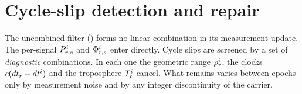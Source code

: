 \documentclass[main.tex]{subfiles}
\begin{document}
\section{Cycle-slip detection and repair}\label{sec:slip}

The uncombined filter () forms no linear combination in its
measurement update.  The per-signal $P^i_{r,s}$ and
$\Phi^i_{r,s}$ enter
 directly.  Cycle slips are screened by a set of
\emph{diagnostic} combinations.  In each one the geometric range
$\rho^i_r$, the clocks
$c(dt_r - dt^i)$ and the troposphere
$T^i_r$ cancel.  What remains varies between epochs only by
measurement noise and by any integer discontinuity of the carrier.
\end{document}
